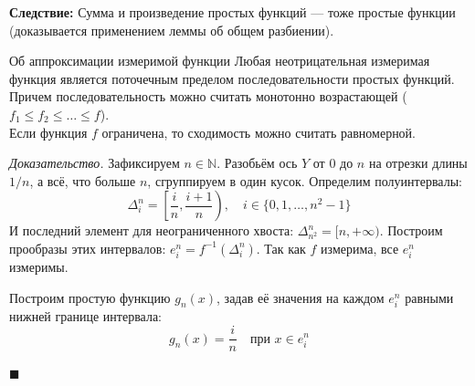 \documentclass[12pt,a4paper]{article}
\newenvironment{Proof}[1][Доказательство]{\vspace{0.5em}\noindent\textit{#1.}\hspace{0.5em}\ignorespaces}{\hfill$\blacksquare$\vspace{1em}}
\begin{document}
\noindent \textbf{Следствие:} Сумма и произведение простых функций — тоже простые функции (доказывается применением леммы об общем разбиении).

\begin{Theorem}{Об аппроксимации измеримой функции}{}
Любая неотрицательная измеримая функция является поточечным пределом последовательности простых функций. Причем последовательность можно считать монотонно возрастающей ($f_1 \le f_2 \le \dots \le f$). \\
Если функция $f$ ограничена, то сходимость можно считать равномерной.
\end{Theorem}

\begin{Proof}
Зафиксируем $n \in \mathbb{N}$. Разобьём ось $Y$ от $0$ до $n$ на отрезки длины $1/n$, а всё, что больше $n$, сгруппируем в один кусок.
Определим полуинтервалы:
$$ \Delta_i^n = \left[ \frac{i}{n}, \frac{i+1}{n} \right), \quad i \in \{0, 1, \dots, n^2-1\} $$
И последний элемент для неограниченного хвоста: $\Delta_{n^2}^n = [n, +\infty)$.
Построим прообразы этих интервалов: $e_i^n = f^{-1}(\Delta_i^n)$. Так как $f$ измерима, все $e_i^n$ измеримы.

Построим простую функцию $g_n(x)$, задав её значения на каждом $e_i^n$ равными нижней границе интервала:
$$ g_n(x) = \frac{i}{n} \quad \text{при } x \in e_i^n $$
\begin{center}
\end{center}
\end{Proof}
\end{document}
